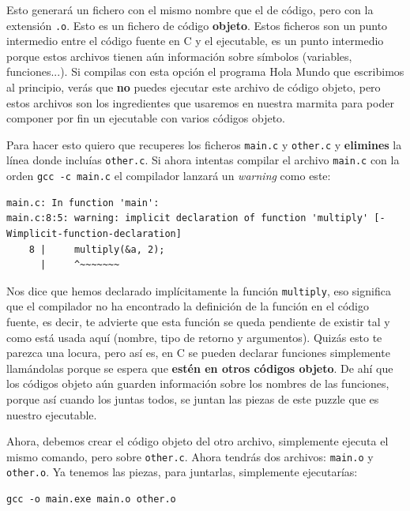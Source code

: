 \documentclass[a4paper]{article}
\begin{document}
Esto generará un fichero con el mismo nombre que el de código, pero con la
extensión \verb!.o!. Esto es un fichero de código \textbf{objeto}. Estos
ficheros son un punto intermedio entre el código fuente en C y el ejecutable,
es un punto intermedio porque estos archivos tienen aún información sobre
símbolos (variables, funciones...). Si compilas con esta opción el programa
Hola Mundo que escribimos al principio, verás que \textbf{no} puedes ejecutar
este archivo de código objeto, pero estos archivos son los ingredientes que
usaremos en nuestra marmita para poder componer por fin un ejecutable con
varios códigos objeto.

Para hacer esto quiero que recuperes los ficheros \verb!main.c! y \verb!other.c!
y \textbf{elimines} la línea donde incluías \verb!other.c!. Si ahora intentas
compilar el archivo \verb!main.c! con la orden
\verb!gcc -c main.c! el compilador lanzará un \emph{warning} como este:

\begin{lstlisting}[style=terminalStyle]
main.c: In function 'main':
main.c:8:5: warning: implicit declaration of function 'multiply' [-Wimplicit-function-declaration]
    8 |     multiply(&a, 2);
      |     ^~~~~~~~
\end{lstlisting}

Nos dice que hemos declarado implícitamente la función \verb!multiply!, eso
significa que el compilador no ha encontrado la definición de la función en el
código fuente, es decir, te advierte que esta función se queda pendiente de
existir tal y como está usada aquí (nombre, tipo de retorno y argumentos).
Quizás esto te parezca una locura, pero así es, en C se pueden declarar
funciones simplemente llamándolas porque se espera que \textbf{estén en otros
códigos objeto}. De ahí que los códigos objeto aún guarden información sobre
los nombres de las funciones, porque así cuando los juntas todos, se juntan
las piezas de este puzzle que es nuestro ejecutable.

Ahora, debemos crear el código objeto del otro archivo, simplemente ejecuta
el mismo comando, pero sobre \verb!other.c!. Ahora tendrás dos archivos:
\verb!main.o! y \verb!other.o!. Ya tenemos las piezas, para juntarlas,
simplemente ejecutarías:
\begin{verbatim}
gcc -o main.exe main.o other.o
\end{verbatim}
\end{document}

